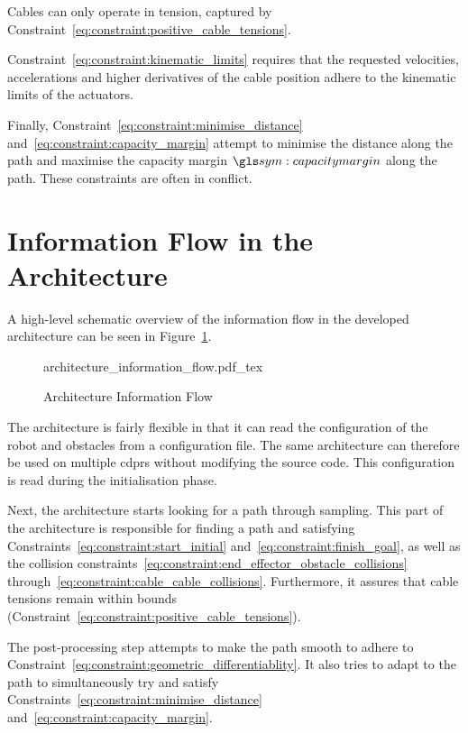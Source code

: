 	Cables can only operate in tension, captured by
	Constraint~\ref{eq:constraint:positive_cable_tensions}.

	Constraint~\ref{eq:constraint:kinematic_limits} requires that the requested
	velocities, accelerations and higher derivatives of the cable position
	adhere to the kinematic limits of the actuators.

	Finally, Constraint~\ref{eq:constraint:minimise_distance}
	and~\ref{eq:constraint:capacity_margin} attempt to minimise the distance
	along the path and maximise the capacity margin $\capacitymargin$ along the
	path. These constraints are often in conflict.

	\section{Information Flow in the Architecture}

		A high-level schematic overview of the information flow in the developed
		architecture can be seen in
		Figure~\ref{fig:architecture_information_flow}.

		\begin{figure}[hbt]
			\centering
			\def\svgwidth{\columnwidth}
			{architecture_information_flow.pdf_tex}
			\caption{Architecture Information Flow}
			\label{fig:architecture_information_flow}
		\end{figure}

		The architecture is fairly flexible in that it can read the
		configuration of the robot and obstacles from a configuration file. The
		same architecture can therefore be used on multiple \glspl{cdpr} without
		modifying the source code. This configuration is read during the
		initialisation phase.

		Next, the architecture starts looking for a path through sampling. This
		part of the architecture is responsible for finding a path and
		satisfying Constraints~\ref{eq:constraint:start_initial}
		and~\ref{eq:constraint:finish_goal}, as well as the collision
		constraints~\ref{eq:constraint:end_effector_obstacle_collisions}
		through~\ref{eq:constraint:cable_cable_collisions}. Furthermore, it
		assures that cable tensions remain within bounds
		(Constraint~\ref{eq:constraint:positive_cable_tensions}).

		The post-processing step attempts to make the path smooth to adhere to
		Constraint~\ref{eq:constraint:geometric_differentiablity}. It also tries
		to adapt to the path to simultaneously try and satisfy
		Constraints~\ref{eq:constraint:minimise_distance}
		and~\ref{eq:constraint:capacity_margin}.

